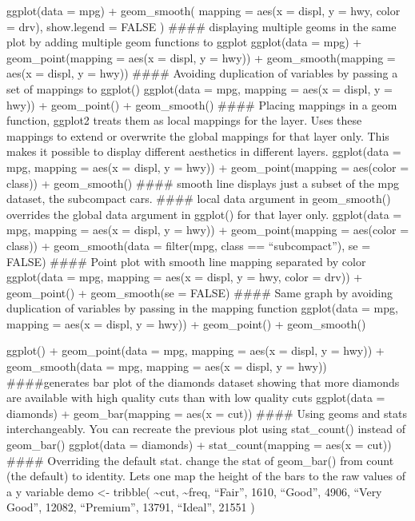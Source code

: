 \documentclass[
]{article}
\begin{document}
ggplot(data = mpg) + geom\_smooth( mapping = aes(x = displ, y = hwy,
color = drv), show.legend = FALSE ) \#\#\#\# displaying multiple geoms
in the same plot by adding multiple geom functions to ggplot ggplot(data
= mpg) + geom\_point(mapping = aes(x = displ, y = hwy)) +
geom\_smooth(mapping = aes(x = displ, y = hwy)) \#\#\#\# Avoiding
duplication of variables by passing a set of mappings to ggplot()
ggplot(data = mpg, mapping = aes(x = displ, y = hwy)) + geom\_point() +
geom\_smooth() \#\#\#\# Placing mappings in a geom function, ggplot2
treats them as local mappings for the layer. Uses these mappings to
extend or overwrite the global mappings for that layer only. This makes
it possible to display different aesthetics in different layers.
ggplot(data = mpg, mapping = aes(x = displ, y = hwy)) +
geom\_point(mapping = aes(color = class)) + geom\_smooth() \#\#\#\#
smooth line displays just a subset of the mpg dataset, the subcompact
cars. \#\#\#\# local data argument in geom\_smooth() overrides the
global data argument in ggplot() for that layer only. ggplot(data = mpg,
mapping = aes(x = displ, y = hwy)) + geom\_point(mapping = aes(color =
class)) + geom\_smooth(data = filter(mpg, class == ``subcompact''), se =
FALSE) \#\#\#\# Point plot with smooth line mapping separated by color
ggplot(data = mpg, mapping = aes(x = displ, y = hwy, color = drv)) +
geom\_point() + geom\_smooth(se = FALSE) \#\#\#\# Same graph by avoiding
duplication of variables by passing in the mapping function ggplot(data
= mpg, mapping = aes(x = displ, y = hwy)) + geom\_point() +
geom\_smooth()

ggplot() + geom\_point(data = mpg, mapping = aes(x = displ, y = hwy)) +
geom\_smooth(data = mpg, mapping = aes(x = displ, y = hwy))
\#\#\#\#generates bar plot of the diamonds dataset showing that more
diamonds are available with high quality cuts than with low quality cuts
ggplot(data = diamonds) + geom\_bar(mapping = aes(x = cut)) \#\#\#\#
Using geoms and stats interchangeably. You can recreate the previous
plot using stat\_count() instead of geom\_bar() ggplot(data = diamonds)
+ stat\_count(mapping = aes(x = cut)) \#\#\#\# Overriding the default
stat. change the stat of geom\_bar() from count (the default) to
identity. Lets one map the height of the bars to the raw values of a y
variable demo \textless- tribble( \textasciitilde cut,
\textasciitilde freq, ``Fair'', 1610, ``Good'', 4906, ``Very Good'',
12082, ``Premium'', 13791, ``Ideal'', 21551 )
\end{document}
